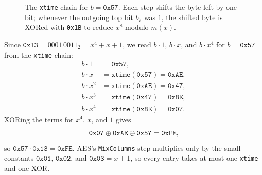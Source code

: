 \begin{figure}[htbp]
\caption{The \texttt{xtime} chain for $b = \texttt{0x57}$. Each step shifts the byte left by one bit; whenever the outgoing top bit $b_7$ was $1$, the shifted byte is XORed with \texttt{0x1B} to reduce $x^8$ modulo $m(x)$.}
\label{ch06:fig-xtime}
\end{figure}

\begin{example}
\label{ch06:ex-mul13}
Since $\texttt{0x13} = 0001\,0011_2 = x^4 + x + 1$, we read $b\cdot 1$,
$b\cdot x$, and $b\cdot x^4$ for $b=\texttt{0x57}$ from the \texttt{xtime}
chain:
\begin{align*}
b\cdot 1 &= \texttt{0x57},\\
b\cdot x &= \texttt{xtime}(\texttt{0x57}) = \texttt{0xAE},\\
b\cdot x^2 &= \texttt{xtime}(\texttt{0xAE}) = \texttt{0x47},\\
b\cdot x^3 &= \texttt{xtime}(\texttt{0x47}) = \texttt{0x8E},\\
b\cdot x^4 &= \texttt{xtime}(\texttt{0x8E}) = \texttt{0x07}.
\end{align*}
XORing the terms for $x^4$, $x$, and $1$ gives
\[
\texttt{0x07} \oplus \texttt{0xAE} \oplus \texttt{0x57} = \texttt{0xFE},
\]
so $\texttt{0x57}\cdot\texttt{0x13} = \texttt{0xFE}$. AES's \texttt{MixColumns}
step multiplies only by the small constants $\texttt{0x01}$, $\texttt{0x02}$,
and $\texttt{0x03} = x + 1$, so every entry takes at most one \texttt{xtime}
and one XOR.
\end{example}

